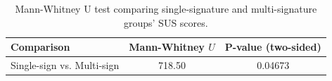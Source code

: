 \begin{table}[tbp]
\centering
\begin{tabular}{lcc}
\toprule
Comparison & Mann-Whitney $U$ & P-value (two-sided) \\ \midrule
Single-sign vs. Multi-sign & 718.50 & 0.04673 \\
\bottomrule
\end{tabular}
\caption{Mann-Whitney U test comparing single-signature and multi-signature groups' SUS scores.}
\label{tab:mannwhitney_group_comparison}
\end{table}
